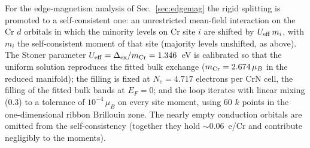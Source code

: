 \documentclass[preprint,12pt]{elsarticle}
\begin{document}
For the edge-magnetism analysis of Sec.~\ref{sec:edgemag} the rigid splitting is promoted to a
self-consistent one: an unrestricted mean-field interaction on the Cr $d$ orbitals in which the
minority levels on Cr site $i$ are shifted by $U_{\rm eff}\,m_i$, with $m_i$ the
self-consistent moment of that site (majority levels unshifted, as above). The Stoner parameter
$U_{\rm eff}=\Delta_{\rm ex}/m_{\rm Cr}=1.346$~eV is calibrated so that the uniform solution
reproduces the fitted bulk exchange ($m_{\rm Cr}=2.674\,\mu_B$ in the reduced manifold); the
filling is fixed at $N_e=4.717$ electrons per CrN cell, the filling of the fitted bulk bands at
$E_F=0$; and the loop iterates with linear mixing ($0.3$) to a tolerance of $10^{-4}\,\mu_B$ on
every site moment, using $60$ $k$ points in the one-dimensional ribbon Brillouin zone. The
nearly empty conduction orbitals are omitted from the self-consistency (together they hold
$\sim$$0.06$~e/Cr and contribute negligibly to the moments).
\end{document}

